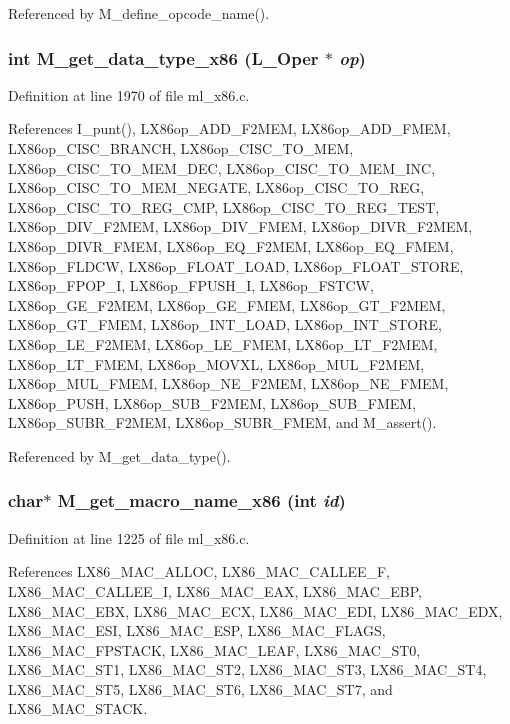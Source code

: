 Referenced by M\_\-define\_\-opcode\_\-name().
\subsubsection{\setlength{\rightskip}{0pt plus 5cm}int M\_\-get\_\-data\_\-type\_\-x86 (L\_\-Oper $\ast$ {\em op})}\label{m__x86_8h_f898a4e675ba9b4f1609ff4f9ac62415}




Definition at line 1970 of file ml\_\-x86.c.

References I\_\-punt(), LX86op\_\-ADD\_\-F2MEM, LX86op\_\-ADD\_\-FMEM, LX86op\_\-CISC\_\-BRANCH, LX86op\_\-CISC\_\-TO\_\-MEM, LX86op\_\-CISC\_\-TO\_\-MEM\_\-DEC, LX86op\_\-CISC\_\-TO\_\-MEM\_\-INC, LX86op\_\-CISC\_\-TO\_\-MEM\_\-NEGATE, LX86op\_\-CISC\_\-TO\_\-REG, LX86op\_\-CISC\_\-TO\_\-REG\_\-CMP, LX86op\_\-CISC\_\-TO\_\-REG\_\-TEST, LX86op\_\-DIV\_\-F2MEM, LX86op\_\-DIV\_\-FMEM, LX86op\_\-DIVR\_\-F2MEM, LX86op\_\-DIVR\_\-FMEM, LX86op\_\-EQ\_\-F2MEM, LX86op\_\-EQ\_\-FMEM, LX86op\_\-FLDCW, LX86op\_\-FLOAT\_\-LOAD, LX86op\_\-FLOAT\_\-STORE, LX86op\_\-FPOP\_\-I, LX86op\_\-FPUSH\_\-I, LX86op\_\-FSTCW, LX86op\_\-GE\_\-F2MEM, LX86op\_\-GE\_\-FMEM, LX86op\_\-GT\_\-F2MEM, LX86op\_\-GT\_\-FMEM, LX86op\_\-INT\_\-LOAD, LX86op\_\-INT\_\-STORE, LX86op\_\-LE\_\-F2MEM, LX86op\_\-LE\_\-FMEM, LX86op\_\-LT\_\-F2MEM, LX86op\_\-LT\_\-FMEM, LX86op\_\-MOVXL, LX86op\_\-MUL\_\-F2MEM, LX86op\_\-MUL\_\-FMEM, LX86op\_\-NE\_\-F2MEM, LX86op\_\-NE\_\-FMEM, LX86op\_\-PUSH, LX86op\_\-SUB\_\-F2MEM, LX86op\_\-SUB\_\-FMEM, LX86op\_\-SUBR\_\-F2MEM, LX86op\_\-SUBR\_\-FMEM, and M\_\-assert().

Referenced by M\_\-get\_\-data\_\-type().
\subsubsection{\setlength{\rightskip}{0pt plus 5cm}char$\ast$ M\_\-get\_\-macro\_\-name\_\-x86 (int {\em id})}\label{m__x86_8h_29e3c015489d3b9770e2253121536275}




Definition at line 1225 of file ml\_\-x86.c.

References LX86\_\-MAC\_\-ALLOC, LX86\_\-MAC\_\-CALLEE\_\-F, LX86\_\-MAC\_\-CALLEE\_\-I, LX86\_\-MAC\_\-EAX, LX86\_\-MAC\_\-EBP, LX86\_\-MAC\_\-EBX, LX86\_\-MAC\_\-ECX, LX86\_\-MAC\_\-EDI, LX86\_\-MAC\_\-EDX, LX86\_\-MAC\_\-ESI, LX86\_\-MAC\_\-ESP, LX86\_\-MAC\_\-FLAGS, LX86\_\-MAC\_\-FPSTACK, LX86\_\-MAC\_\-LEAF, LX86\_\-MAC\_\-ST0, LX86\_\-MAC\_\-ST1, LX86\_\-MAC\_\-ST2, LX86\_\-MAC\_\-ST3, LX86\_\-MAC\_\-ST4, LX86\_\-MAC\_\-ST5, LX86\_\-MAC\_\-ST6, LX86\_\-MAC\_\-ST7, and LX86\_\-MAC\_\-STACK.

